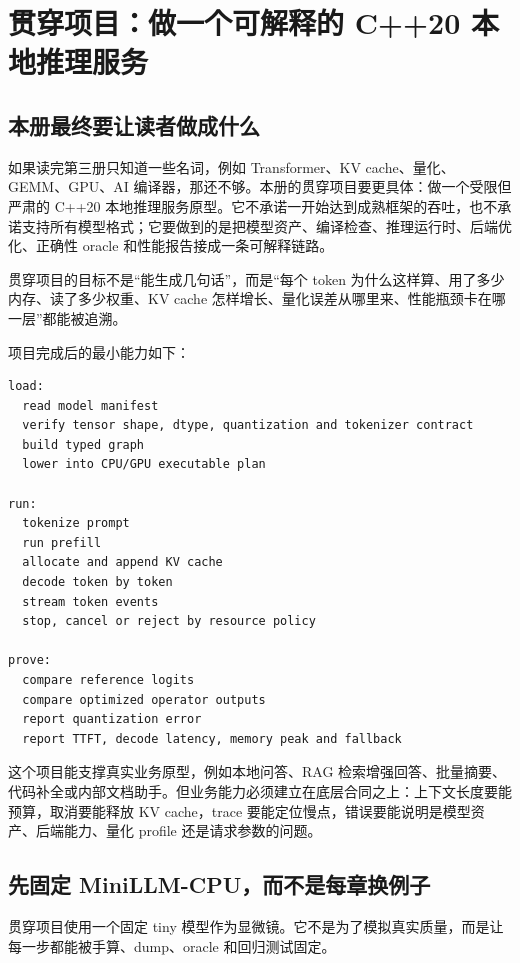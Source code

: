 \section{贯穿项目：做一个可解释的 C++20 本地推理服务}

\subsection{本册最终要让读者做成什么}

如果读完第三册只知道一些名词，例如 Transformer、KV cache、量化、GEMM、GPU、AI 编译器，那还不够。本册的贯穿项目要更具体：做一个受限但严肃的 C++20 本地推理服务原型。它不承诺一开始达到成熟框架的吞吐，也不承诺支持所有模型格式；它要做到的是把模型资产、编译检查、推理运行时、后端优化、正确性 oracle 和性能报告接成一条可解释链路。

\begin{keyidea}
贯穿项目的目标不是“能生成几句话”，而是“每个 token 为什么这样算、用了多少内存、读了多少权重、KV cache 怎样增长、量化误差从哪里来、性能瓶颈卡在哪一层”都能被追溯。
\end{keyidea}

项目完成后的最小能力如下：

\begin{lstlisting}[numbers=none,caption={第三册贯穿项目的最终能力}]
load:
  read model manifest
  verify tensor shape, dtype, quantization and tokenizer contract
  build typed graph
  lower into CPU/GPU executable plan

run:
  tokenize prompt
  run prefill
  allocate and append KV cache
  decode token by token
  stream token events
  stop, cancel or reject by resource policy

prove:
  compare reference logits
  compare optimized operator outputs
  report quantization error
  report TTFT, decode latency, memory peak and fallback
\end{lstlisting}

这个项目能支撑真实业务原型，例如本地问答、RAG 检索增强回答、批量摘要、代码补全或内部文档助手。但业务能力必须建立在底层合同之上：上下文长度要能预算，取消要能释放 KV cache，trace 要能定位慢点，错误要能说明是模型资产、后端能力、量化 profile 还是请求参数的问题。

\subsection{先固定 MiniLLM-CPU，而不是每章换例子}

贯穿项目使用一个固定 tiny 模型作为显微镜。它不是为了模拟真实质量，而是让每一步都能被手算、dump、oracle 和回归测试固定。

